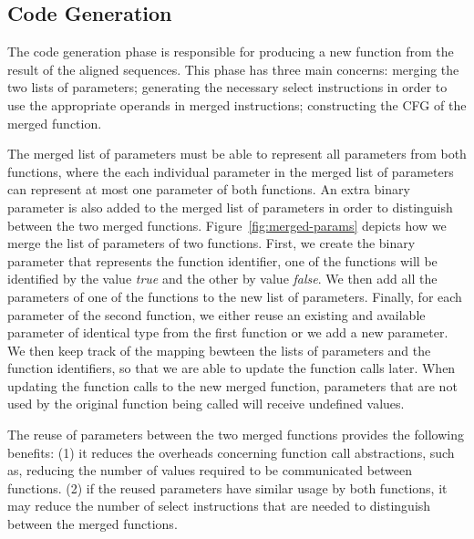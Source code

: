 \subsection{Code Generation}

The code generation phase is responsible for producing a new function from the
result of the aligned sequences.
This phase has three main concerns: merging the two lists of parameters;
generating the necessary select instructions in order to
use the appropriate operands in merged instructions;
constructing the CFG of the merged function.


The merged list of parameters must be able to represent all parameters from
both functions, where the each individual parameter in the merged list of
parameters can represent at most one parameter of both functions.
An extra binary parameter is also added to the merged list of parameters in
order to distinguish between the two merged functions.
Figure~\ref{fig:merged-params} depicts how we merge the list of parameters of
two functions.
First, we create the binary parameter that represents the function identifier, 
one of the functions will be identified by the value \textit{true} and the other
by value \textit{false}.
We then add all the parameters of one of the functions to the new list of
parameters.
Finally, for each parameter of the second function, we either reuse an existing
and available parameter of identical type from the first function or we add a
new parameter.  
We then keep track of the mapping bewteen the lists of parameters and the
function identifiers, so that we are able to update the function calls later.
When updating the function calls to the new merged function, parameters that are
not used by the original function being called will receive undefined values.

The reuse of parameters between the two merged functions provides the following
benefits:
(1) it reduces the overheads concerning function call abstractions, such as,
reducing the number of values required to be communicated between functions.
(2) if the reused parameters have similar usage by both functions, it may reduce
the number of select instructions that are needed to distinguish between the
merged functions.


